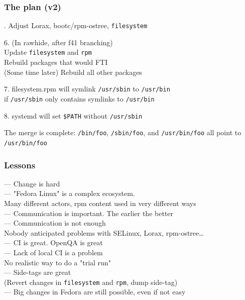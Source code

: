 \documentclass[]{beamer}
\begin{document}
\begin{frame}[fragile]
  \frametitle{The plan (v2)}

  . Adjust Lorax, bootc/rpm-ostree, \texttt{filesystem}
  \\\pause

  6. (In rawhide, after f41 branching)\\
  Update \texttt{filesystem} and \texttt{rpm}\\
  Rebuild packages that would FTI\\
  (Some time later) Rebuild all other packages
  \\\pause

  7. filesystem.rpm will symlink \texttt{/usr/sbin} to \texttt{/usr/bin}\\
  if \texttt{/usr/sbin} only contains symlinks to \texttt{/usr/bin}
  \\\pause

  8. systemd will set \texttt{\$PATH} without \texttt{/usr/sbin}
  \\\pause

  The merge is complete: \texttt{/bin/foo}, \texttt{/sbin/foo}, and
  \texttt{/usr/bin/foo} all point to \texttt{/usr/bin/foo} 
\end{frame}

\begin{frame}
  \frametitle{Lessons}

  \pause
  — Change is hard
  \\\pause
  — "Fedora Linux" is a complex ecosystem.\\
  \phantom{—} Many different actors, rpm content used in very different ways
  \\\pause
  — Communication is important. The earlier the better
  \\\pause
  — Communication is not enough\\
  \phantom{—} Nobody anticipated problems with SELinux, Lorax, rpm-ostree…
  \\\pause
  — CI is great. OpenQA is great
  \\\pause
  — Lack of local CI is a problem\\
  \phantom{—} No realistic way to do a "trial run"
  \\\pause
  — Side-tags are great\\
  \phantom{—} (Revert changes in \texttt{filesystem} and \texttt{rpm}, dump side-tag)
  \\\pause
  — Big changes in Fedora are still possible, even if not easy
\end{frame}
\end{document}
